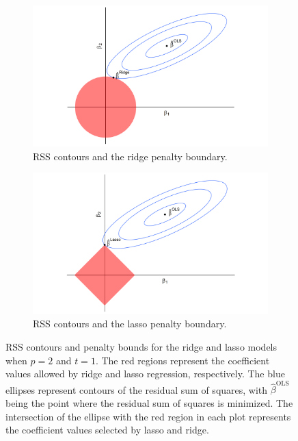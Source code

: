 \documentclass{article}
\begin{document}
\begin{figure}[!b]
	\centering
	\begin{subfigure}[b]{0.45\textwidth}
		\includegraphics[width=\textwidth]{images/ridge-diagram.png}
		\captionsetup{width = 0.8\textwidth}
		\caption{RSS contours and the ridge penalty boundary.}
		\label{fig:ridge-diagram}
	\end{subfigure}
	\hspace{30pt}
	\begin{subfigure}[b]{0.45\textwidth}
		\includegraphics[width=\textwidth]{images/lasso-diagram.png}
		\captionsetup{width = 0.8\textwidth}
		\caption{RSS contours and the lasso penalty boundary.}
		\label{fig:lasso-diagram}
	\end{subfigure}
	\captionsetup{width = 0.9\textwidth}
	\caption{RSS contours and penalty bounds for the ridge and lasso models when $p=2$ and $t = 1$. The red regions represent the coefficient values allowed by ridge and lasso regression, respectively. The blue ellipses represent contours of the residual sum of squares, with $\hat{\beta}^{\text{OLS}}$ being the point where the residual sum of squares is minimized. The intersection of the ellipse with the red region in each plot represents the coefficient values selected by lasso and ridge.}
	\label{fig:ridge-lasso-diagram}
\end{figure}
\end{document}
